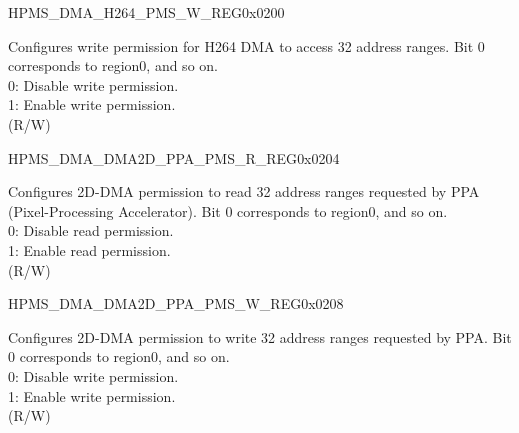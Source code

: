 \begin{register}{H}{PMS\_DMA\_H264\_PMS\_W\_REG}{0x0200}\label{regdesc:PMSDMAH264PMSWREG}
%
\regnewline%
\begin{regdesc}\begin{reglist}
\label{fielddesc:PMSDMAH264WPMS}\item [PMS\_DMA\_H264\_W\_PMS] Configures write permission for H264 DMA to access 32 address ranges. Bit 0 corresponds to region0, and so on.\\
0: Disable write permission.\\
1: Enable write permission.\\ (R/W)
\end{reglist}\end{regdesc}
\end{register}


\begin{register}{H}{PMS\_DMA\_DMA2D\_PPA\_PMS\_R\_REG}{0x0204}\label{regdesc:PMSDMADMA2DPPAPMSRREG}
%
\regnewline%
\begin{regdesc}\begin{reglist}
\label{fielddesc:PMSDMADMA2DPPARPMS}\item [PMS\_DMA\_DMA2D\_PPA\_R\_PMS] Configures 2D-DMA permission to read 32 address ranges requested by PPA (Pixel-Processing Accelerator). Bit 0 corresponds to region0, and so on.\\
0: Disable read permission.\\
1: Enable read permission.\\ (R/W)
\end{reglist}\end{regdesc}
\end{register}


\begin{register}{H}{PMS\_DMA\_DMA2D\_PPA\_PMS\_W\_REG}{0x0208}\label{regdesc:PMSDMADMA2DPPAPMSWREG}
%
\regnewline%
\begin{regdesc}\begin{reglist}
\label{fielddesc:PMSDMADMA2DPPAWPMS}\item [PMS\_DMA\_DMA2D\_PPA\_W\_PMS] Configures 2D-DMA permission to write 32 address ranges requested by PPA. Bit 0 corresponds to region0, and so on.\\
0: Disable write permission.\\
1: Enable write permission.\\ (R/W)
\end{reglist}\end{regdesc}
\end{register}


